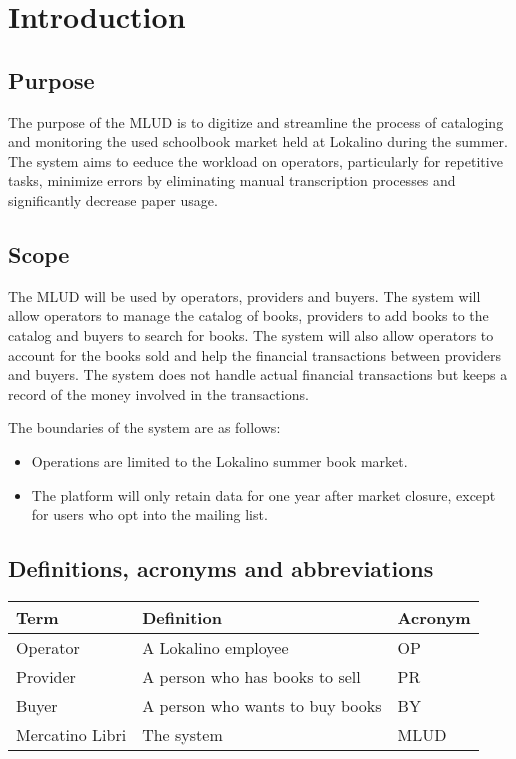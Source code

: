 \chapter{Introduction}

\section{Purpose}

The purpose of the MLUD is to digitize and streamline the process of cataloging and monitoring the used schoolbook market held at Lokalino during the summer. The system aims to eeduce the workload on operators, particularly for repetitive tasks, minimize errors by eliminating manual transcription processes and significantly decrease paper usage.

\section{Scope}

The MLUD will be used by operators, providers and buyers. The system will allow operators to manage the catalog of books, providers to add books to the catalog and buyers to search for books. The system will also allow operators to account for the books sold and help the financial transactions between providers and buyers.
The system does not handle actual financial transactions but keeps a record of the money involved in the transactions.

\noindent The boundaries of the system are as follows:
\begin{itemize}
    \item Operations are limited to the Lokalino summer book market.
    \item The platform will only retain data for one year after market closure, except for users who opt into the mailing list.
\end{itemize}

\section{Definitions, acronyms and abbreviations}

\begin{table}[H]
    \centering
    \begin{tabular}{|l|l|l|}
        \hline
        \textbf{Term}   & \textbf{Definition}             & \textbf{Acronym} \\ \hline
        Operator        & A Lokalino employee             & OP               \\
        Provider        & A person who has books to sell  & PR               \\
        Buyer           & A person who wants to buy books & BY               \\
        Mercatino Libri & The system                      & MLUD             \\\hline
    \end{tabular}
\end{table} 